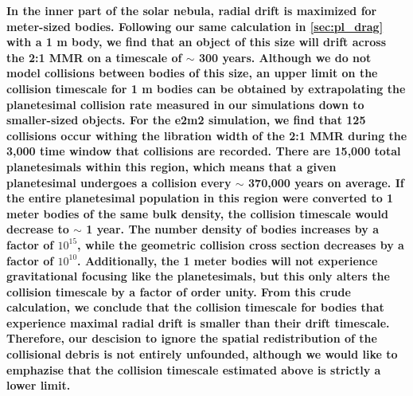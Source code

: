 \documentclass[fleqn,usenatbib]{mnras}
\begin{document}
\textbf{In the inner part of the solar nebula, radial drift is maximized for meter-sized bodies. Following our same calculation in \ref{sec:pl_drag} with a 1 m body, we find that an object of this size will drift across the 2:1 MMR on a timescale of $\sim$ 300 years. Although we do not model collisions between bodies of this size, an upper limit on the collision timescale for 1 m bodies can be obtained by extrapolating the planetesimal collision rate measured in our simulations down to smaller-sized objects. For the e2m2 simulation, we find that 125 collisions occur withing the libration width of the 2:1 MMR during the 3,000 time window that collisions are recorded. There are 15,000 total planetesimals within this region, which means that a given planetesimal undergoes a collision every $\sim$ 370,000 years on average. If the entire planetesimal population in this region were converted to 1 meter bodies of the same bulk density, the collision timescale would decrease to $\sim$ 1 year. The number density of bodies increases by a factor of $10^{15}$, while the geometric collision cross section decreases by a factor of $10^{10}$. Additionally, the 1 meter bodies will not experience gravitational focusing like the planetesimals, but this only alters the collision timescale by a factor of order unity. From this crude calculation, we conclude that the collision timescale for bodies that experience maximal radial drift is smaller than their drift timescale. Therefore, our descision to ignore the spatial redistribution of the collisional debris is not entirely unfounded, although we would like to emphazise that the collision timescale estimated above is strictly a lower limit.}
\end{document}
